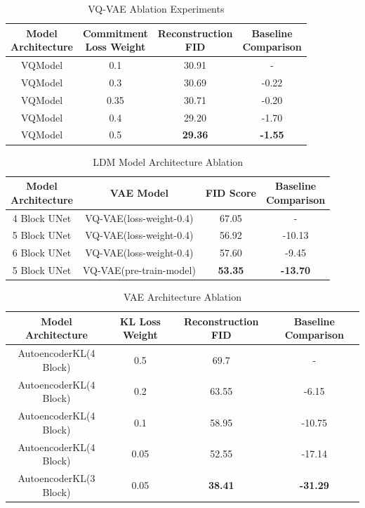 \documentclass[conference]{IEEEtran}
\begin{document}
\begin{table}[H]
    \centering
    \caption{VQ-VAE Ablation Experiments}
    \label{tab:ldm_table1}
    \begin{tabular}{cccc}
    \hline
        \makecell{Model\\Architecture} & \makecell{Commitment\\Loss Weight} & \makecell{Reconstruction\\FID} & \makecell{Baseline\\Comparison} \\
        \hline
        \hline
        VQModel & 0.1 & 30.91 & - \\
        \hline
        VQModel & 0.3 & 30.69 & -0.22 \\ 
        VQModel & 0.35 & 30.71 & -0.20 \\ 
        VQModel & 0.4 & 29.20 & -1.70 \\ 
        VQModel & 0.5 & \textbf{29.36} & \textbf{-1.55} \\ \hline
    \end{tabular}
\end{table}

\begin{table}[H]
    \centering
    \caption{LDM Model Architecture Ablation}
    \label{tab:ldm_table2}
    \begin{tabular}{cccc}
    \hline
        \makecell{Model\\Architecture} & VAE Model & FID Score & \makecell{Baseline\\Comparison} \\ \hline
        \hline
        4 Block UNet & VQ-VAE(loss-weight-0.4) & 67.05 & - \\
        \hline
        5 Block UNet & VQ-VAE(loss-weight-0.4) & 56.92 & -10.13 \\ 
        6 Block UNet & VQ-VAE(loss-weight-0.4) & 57.60 & -9.45 \\ 
        5 Block UNet & VQ-VAE(pre-train-model) & \textbf{53.35} & \textbf{-13.70} \\
        \hline
    \end{tabular}
\end{table}

\begin{table}[H]
    \centering
    \caption{VAE Architecture Ablation}
    \label{tab:dit_table1}
    \begin{tabular}{cccc}
    \hline
        Model Architecture & KL Loss Weight & Reconstruction FID & Baseline Comparison \\ \hline
        \hline
        AutoencoderKL(4 Block) & 0.5 & 69.7 & - \\
        \hline
        AutoencoderKL(4 Block) & 0.2 & 63.55 & -6.15 \\ 
        AutoencoderKL(4 Block) & 0.1 & 58.95 & -10.75 \\ 
        AutoencoderKL(4 Block) & 0.05 & 52.55 & -17.14 \\ 
        AutoencoderKL(3 Block) & 0.05 & \textbf{38.41} & \textbf{-31.29} \\ \hline
    \end{tabular}
\end{table}
\end{document}
